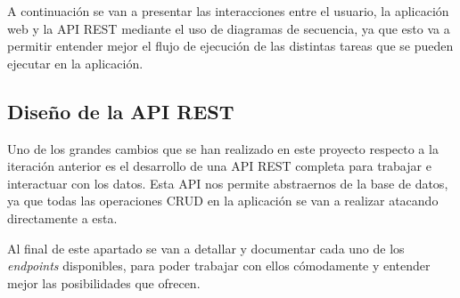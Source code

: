 A continuación se van a presentar las interacciones entre el usuario, la aplicación web y la API REST mediante el uso de diagramas de secuencia, ya que esto va a permitir entender mejor el flujo de ejecución de las distintas tareas que se pueden ejecutar en la aplicación.











\subsection{Diseño de la API REST}

Uno de los grandes cambios que se han realizado en este proyecto respecto a la iteración anterior es el desarrollo de una API REST completa para trabajar e interactuar con los datos. Esta API nos permite abstraernos de la base de datos, ya que todas las operaciones CRUD en la aplicación se van a realizar atacando directamente a esta.

Al final de este apartado se van a detallar y documentar cada uno de los \textit{endpoints} disponibles, para poder trabajar con ellos cómodamente y entender mejor las posibilidades que ofrecen.

